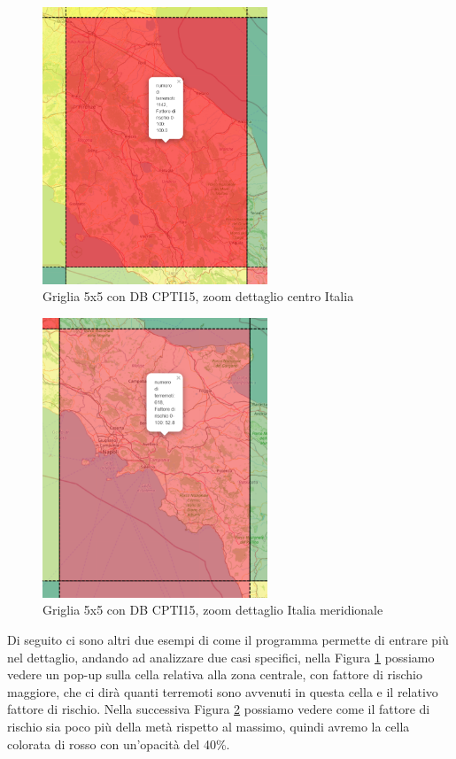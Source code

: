 \begin{figure}[H]
   \centering
   \includegraphics[width=0.600\textwidth]{images/FattoreDiRischio5x5_CPTI15_centro.png}
   \caption{Griglia 5x5 con DB CPTI15, zoom dettaglio centro Italia}
   \label{fig:zonaCentrale}
\end{figure}

\begin{figure}[H]
   \centering
   \includegraphics[width=0.600\textwidth]{images/FattoreDiRischio5x5_CPTI15_meridione.png}
   \caption{Griglia 5x5 con DB CPTI15, zoom dettaglio Italia meridionale}
   \label{fig:zonaMeridionale}
\end{figure}

Di seguito ci sono altri due esempi di come il programma permette di entrare pi\`u nel dettaglio, andando ad analizzare due casi specifici, nella Figura \ref{fig:zonaCentrale} possiamo vedere un pop-up sulla cella relativa alla zona centrale, con fattore di rischio maggiore, che ci dir\`a quanti terremoti sono avvenuti in questa cella e il relativo fattore di rischio. Nella successiva Figura \ref{fig:zonaMeridionale} possiamo vedere come il fattore di rischio sia poco pi\`u della met\`a rispetto al massimo, quindi avremo la cella colorata di rosso con un'opacit\`a del 40\%.

